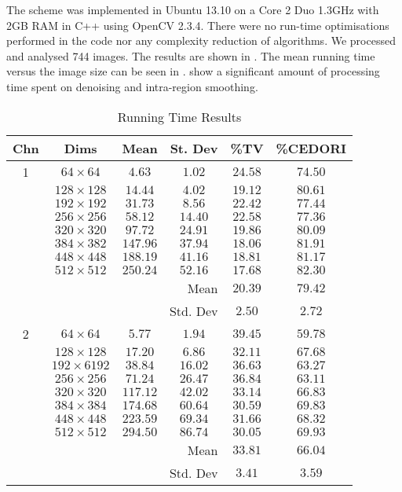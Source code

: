 \begin{definition}
	The scheme was implemented in Ubuntu 13.10 on a Core 2 Duo 1.3GHz with 2GB RAM in C++ using OpenCV 2.3.4. There were no run-time optimisations performed in the code nor any complexity reduction of algorithms. We processed and analysed 744 images. The results are shown in . The mean running time versus the image size can be seen in .  show a significant amount of processing time spent on denoising and intra-region smoothing.
	
	\begin{table}[!h]
		\renewcommand{\arraystretch}{1.3}
		\caption{Running Time Results}
		\label{tab:results_runningtime}
		\centering
		\begin{tabular}{|c|c|c|c|c|c|}
			\hline
			Chn		& Dims 		& Mean	& St. Dev	& \%TV	& \%CEDORI \\ \hline
			1 			& $64\times64$	& $4.63$	& $1.02$	& $24.58$& $74.50$\\
			& $128\times128$	& $14.44$& $4.02$& $19.12$& $80.61$ \\
			& $192\times192$	& $31.73$& $8.56$& $22.42$& $77.44$ \\
			& $256\times256$	& $58.12$& $14.40$& $22.58$& $77.36$ \\
			& $320\times320$	& $97.72$& $24.91$& $19.86$& $80.09$ \\
			& $384\times382$	& $147.96$& $37.94$& $18.06$& $81.91$ \\
			& $448\times448$	& $188.19$& $41.16$& $18.81$& $81.17$ \\
			& $512\times512$	& $250.24$& $52.16$& $17.68$& $82.30$ \\
			\hline
			\multicolumn{4}{|r}{Mean} & $20.39$ & $79.42$ \\
			\multicolumn{4}{|r}{Std. Dev} & $2.50$ & $2.72$ \\
			\hline
			
			2 		 	& $64\times64$	&$5.77$	 &$1.94$	 &$39.45$& $59.78$ \\
			& $128\times128$	&$17.20$	 &$6.86$ &$32.11$& $67.68$ \\
			& $192\times6192$&$38.84$	 &$16.02$&$36.63$& $63.27$ \\          			
			& $256\times256$	&$71.24$	 &$26.47$&$36.84$& $63.11$ \\
			& $320\times320$ &$117.12$&$42.02$&$33.14$	& $66.83$ \\
			& $384\times384$ &$174.68$&$60.64$&$30.59$	& $69.83$ \\
			& $448\times448$ &$223.59$&$69.34$&$31.66$	& $68.32$ \\
			& $512\times512$ &$294.50$&$86.74$&$30.05$	& $69.93$ \\
			\hline
			\multicolumn{4}{|r}{Mean} & $33.81$ & $66.04$ \\
			\multicolumn{4}{|r}{Std. Dev} & $3.41$ & $3.59$ \\
			\hline
			

\end{tabular}
\end{table}
\end{definition}
